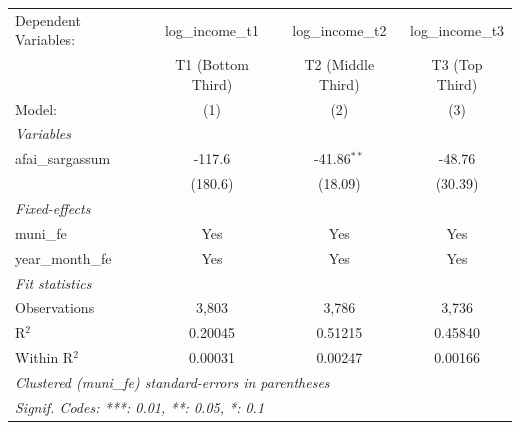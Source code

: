 \begingroup
\centering
\begin{tabular}{lccc}
   \tabularnewline \midrule \midrule
   Dependent Variables: & log\_income\_t1   & log\_income\_t2   & log\_income\_t3\\    
                        & T1 (Bottom Third) & T2 (Middle Third) & T3 (Top Third) \\   
   Model:               & (1)               & (2)               & (3)\\  
   \midrule
   \emph{Variables}\\
   afai\_sargassum      & -117.6            & -41.86$^{**}$     & -48.76\\   
                        & (180.6)           & (18.09)           & (30.39)\\   
   \midrule
   \emph{Fixed-effects}\\
   muni\_fe             & Yes               & Yes               & Yes\\  
   year\_month\_fe      & Yes               & Yes               & Yes\\  
   \midrule
   \emph{Fit statistics}\\
   Observations         & 3,803             & 3,786             & 3,736\\  
   R$^2$                & 0.20045           & 0.51215           & 0.45840\\  
   Within R$^2$         & 0.00031           & 0.00247           & 0.00166\\  
   \midrule \midrule
   \multicolumn{4}{l}{\emph{Clustered (muni\_fe) standard-errors in parentheses}}\\
   \multicolumn{4}{l}{\emph{Signif. Codes: ***: 0.01, **: 0.05, *: 0.1}}\\
\end{tabular}
\par\endgroup
